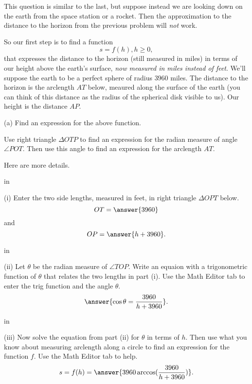 \documentclass{ximera}
\newcommand{\pskip}{\vskip 0.1 in}
\begin{document}
\begin{question}  \label{Q34eefg4t3}
This question is similar to the last, but suppose instead we are looking down on the earth from the space station or a rocket. Then the approximation to the distance to the horizon from the previous problem will \emph{not} work.

So our first step is to find a function
\[
   s = f(h), h\geq 0 ,
\]
that expresses the distance to the horizon (still measured in miles) in terms of our height above the earth's surface, \emph{now measured in miles instead of feet}. We'll suppose the earth to be a perfect sphere of radius $3960$ miles. The distance to the horizon is the arclength $AT$ below, meaured along the surface of the earth (you can think of this distance as the radius of the spherical disk visible to us). Our height is the distance $AP$. 

 
\begin{onlineOnly}
    \begin{center}
\end{center}
\end{onlineOnly}

(a) Find an expression for the above function. 
\begin{hint}
Use right triangle $\Delta OTP$ to find an expression for the radian measure of angle $\angle POT$. Then use this angle to find an expression for the arclength $AT$.

Here are more details.

\pskip

(i) Enter the two side lengths, measured in feet, in right triangle $\Delta OPT$ below.
\[
      OT = \answer{3960}
\]
and
\[
        OP = \answer{h+3960} .
\]

\pskip

(ii) Let $\theta$ be the radian measure of $\angle TOP$. Write an equaion with a trigonometric function of $\theta$ that relates the two lengths in part (i). Use the Math Editor tab to enter the trig function and the angle $\theta$.
\[
     \answer{\cos \theta = \frac{3960}{h+3960}}.
\]

\pskip

(iii) Now solve the equation from part (ii) for $\theta$ in terms of $h$. Then use what you know about measuring arclength along a circle to find an expression for the function $f$. Use the Math Editor tab to help.
\[
      s = f(h) = \answer{3960 \arccos( \frac{3960}{h+3960})} .
\]
 

\end{hint}






\end{question}
\end{document}
